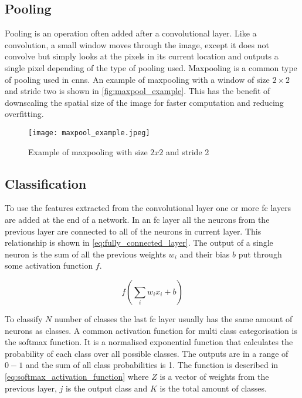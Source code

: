 \subsection{Pooling}
Pooling is an operation often added after a convolutional layer. Like a convolution, a small window moves through the image, except it does not convolve but simply looks at the pixels in its current location and outputs a single pixel depending of the type of pooling used. Maxpooling is a common type of pooling used in \gls{cnn}s. An example of maxpooling with a window of size $2\times2$ and stride two is shown in \autoref{fig:maxpool_example}. This has the benefit of downscaling the spatial size of the image for faster computation and reducing overfitting.

\begin{figure}[H]
\centering
\texttt{[image: maxpool\_example.jpeg]}
\caption{Example of maxpooling with size $2x2$ and stride 2 \citep{Karpathy2016a}}
\label{fig:maxpool_example}
\end{figure}

\subsection{Classification}
To use the features extracted from the convolutional layer one or more \gls{fc} layers are added at the end of a network. In an \gls{fc} layer all the neurons from the previous layer are connected to all of the neurons in current layer. This relationship is shown in \autoref{eq:fully_connected_layer}. The output of a single neuron is the sum of all the previous weights $w_i$ and their bias $b$ put through some activation function $f$.

\begin{equation}
\label{eq:fully_connected_layer}
f\left(\sum_{i}w_{i}x_{i}+b\right)
\end{equation}

To classify $N$ number of classes the last \gls{fc} layer usually has the same amount of neurons as classes. A common activation function for multi class categorisation is the softmax function. It is a normalised exponential function that calculates the probability of each class over all possible classes. The outputs are in a range of $0 - 1$ and the sum of all class probabilities is 1. The function is described in \autoref{eq:softmax_activation_function} where $Z$ is a vector of weights from the previous layer, $j$ is the output class and $K$ is the total amount of classes.

